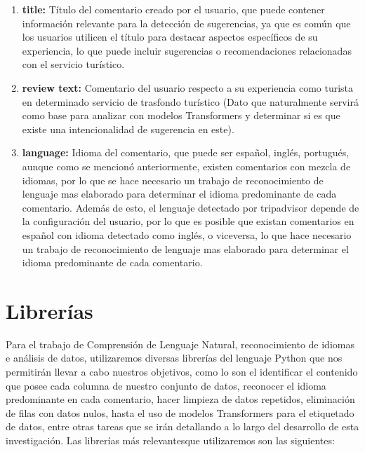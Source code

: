 \begin{enumerate}
    \item \textbf{title:} Título del comentario creado por el usuario, que puede contener información relevante para la detección de sugerencias, ya que es común que los usuarios utilicen el título para destacar aspectos específicos de su experiencia, lo que puede incluir sugerencias o recomendaciones relacionadas con el servicio turístico.
    \item \textbf{review text:} Comentario del usuario respecto a su experiencia como turista en determinado servicio de trasfondo turístico (Dato que naturalmente servirá como base para analizar con modelos Transformers y determinar si es que existe una intencionalidad de sugerencia en este).
    \item \textbf{language:} Idioma del comentario, que puede ser español, inglés, portugués, aunque como se mencionó anteriormente, existen comentarios con mezcla de idiomas, por lo que se hace necesario un trabajo de reconocimiento de lenguaje mas elaborado para determinar el idioma predominante de cada comentario. Además de esto, el lenguaje detectado por tripadvisor depende de la configuración del usuario, por lo que es posible que existan comentarios en español con idioma detectado como inglés, o viceversa, lo que hace necesario un trabajo de reconocimiento de lenguaje mas elaborado para determinar el idioma predominante de cada comentario.
\end{enumerate}

\section{\textbf{Librerías}}
\label{cha:OLLAMA}
\label{cha:MLX}

Para el trabajo de Comprensión de Lenguaje Natural, reconocimiento de idiomas e análisis de datos, utilizaremos diversas librerías del lenguaje Python que nos permitirán llevar a cabo nuestros objetivos, como lo son el identificar el contenido que posee cada columna de nuestro conjunto de datos, reconocer el idioma predominante en cada comentario, hacer limpieza de datos repetidos, eliminación de filas con datos nulos, hasta el uso de modelos Transformers para el etiquetado de datos, entre otras tareas que se irán detallando a lo largo del desarrollo de esta investigación. Las librerías más relevantesque utilizaremos son las siguientes:

